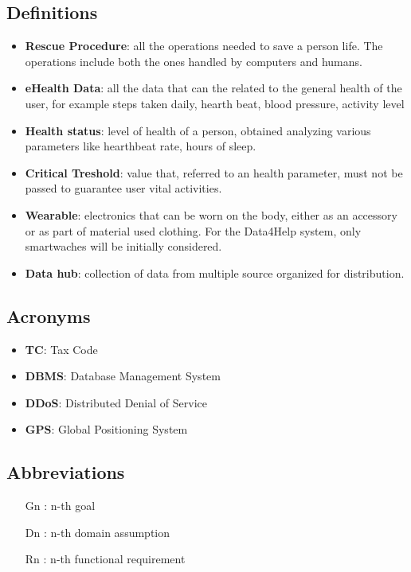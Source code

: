 \subsection{Definitions}
\begin{itemize}
\item \textbf{Rescue Procedure}: all the operations needed to save a person life. The operations include both the ones handled by computers and humans.
\item \textbf{eHealth Data}: all the data that can the related to the general health of the user, for example steps taken daily, hearth beat, blood pressure, activity level
\item \textbf{Health status}: level of health of a person, obtained analyzing various parameters like  hearthbeat rate, hours of sleep.
\item \textbf{Critical Treshold}: value that, referred to an health parameter, must not be passed to guarantee user vital activities.
\item \textbf{Wearable}: electronics that can be worn on the body, either as an accessory or as part of material used clothing. For the Data4Help system, only smartwaches will be initially considered.
\item \textbf{Data hub}: collection of data from multiple source organized for distribution.
\end{itemize}




\subsection{Acronyms}

\begin{itemize}
\item \textbf{TC}: Tax Code
\item \textbf{DBMS}: Database Management System
\item \textbf{DDoS}: Distributed Denial of Service
\item \textbf{GPS}: Global Positioning System
\end{itemize}

\subsection{Abbreviations}
\begin{itemize}
\item[Gn]: n-th goal
\item[Dn]: n-th domain assumption
\item[Rn]: n-th functional requirement
\end{itemize}



